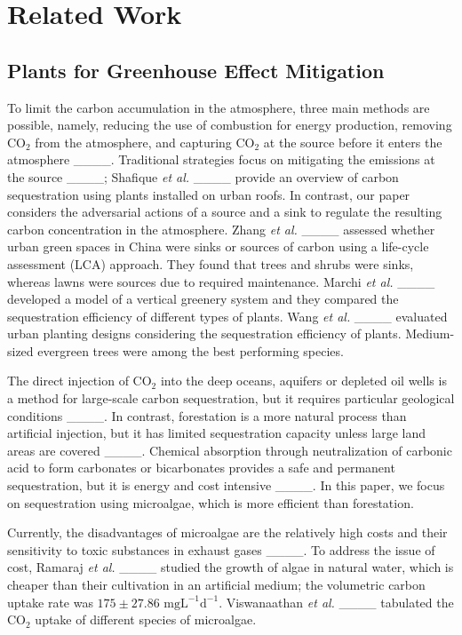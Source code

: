 \section{Related Work}
\label{sec:relWork}
\subsection{Plants for Greenhouse Effect Mitigation}
To limit the carbon accumulation in the atmosphere, three main methods are possible, namely, reducing the use of combustion for energy production, removing $\text{CO}_2$ from the atmosphere, and capturing $\text{CO}_2$ at the source before it enters the atmosphere ____. Traditional strategies focus on mitigating the emissions at the source ____; Shafique \textit{et al.} ____ provide an overview of carbon sequestration using plants installed on urban roofs. In contrast, our paper considers the adversarial actions of a source and a sink to regulate the resulting carbon concentration in the atmosphere. Zhang \textit{et al.} ____ assessed whether urban green spaces in China were sinks or sources of carbon using a life-cycle assessment (LCA) approach. They found that trees and shrubs were sinks, whereas lawns were sources due to required maintenance. Marchi \textit{et al.} ____ developed a model of a vertical greenery system and they compared the sequestration efficiency of different types of plants. Wang \textit{et al.} ____ evaluated urban planting designs considering the sequestration efficiency of plants. Medium-sized evergreen trees were among the best performing species.    
    
The direct injection of $\text{CO}_2$ into the deep oceans, aquifers or depleted oil wells is a method for large-scale carbon sequestration, but it requires particular geological conditions ____. In contrast, forestation is a more natural process than artificial injection, but it has limited sequestration capacity unless large land areas are covered ____. Chemical absorption through neutralization of carbonic acid to form carbonates or bicarbonates provides a safe and permanent sequestration, but it is energy and cost intensive ____. In this paper, we focus on sequestration using microalgae, which is more efficient than forestation. 

Currently, the disadvantages of microalgae are the relatively high costs and their sensitivity to toxic substances in exhaust gases ____. To address the issue of cost, Ramaraj \textit{et al.} ____ studied the growth of algae in natural water, which is cheaper than their cultivation in an artificial medium; the volumetric carbon uptake rate was $175 \pm 27.86 \text{ mg}\text{L}^{-1}\text{d}^{-1}$. Viswanaathan \textit{et al.} ____ tabulated the $\text{CO}_2$ uptake of different species of microalgae.  

